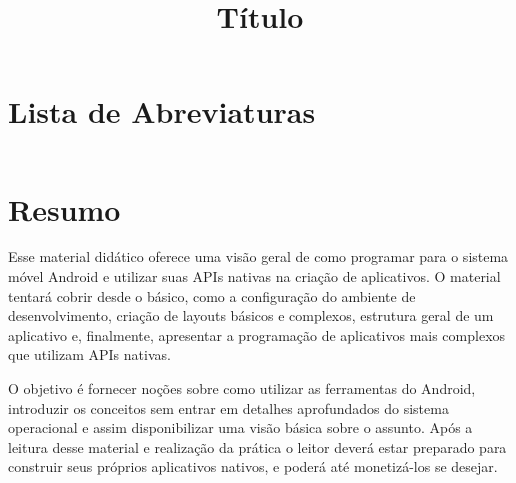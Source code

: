 \documentclass[a4paper,12pt,brazil]{book}
\title{Título}
\begin{document}



\pagestyle{empty}

\clearpage

\onehalfspace

\pagestyle{plain}

\setcounter{tocdepth}{1} %
\tableofcontents
\clearpage %
\thispagestyle{empty}

\listoffigures
{}
\clearpage %
\thispagestyle{empty}

\listoftables
{}
\clearpage %
\thispagestyle{empty}

\listoflistings
{}
\clearpage %
\thispagestyle{empty}

\chapter*{Lista de Abreviaturas}
\begin{longtable}{ll}
\end{longtable}



\chapter*{Resumo}

\begin{singlespace}
Esse material didático oferece uma visão geral de como programar para o sistema móvel Android e utilizar suas APIs nativas na criação de aplicativos. O material tentará cobrir desde o básico, como a configuração do ambiente de desenvolvimento, criação de layouts básicos e complexos, estrutura geral de um aplicativo e, finalmente, apresentar a programação de aplicativos mais complexos que utilizam APIs nativas.

O objetivo é fornecer noções sobre como utilizar as ferramentas do Android, introduzir os conceitos sem entrar em detalhes aprofundados do sistema operacional e assim disponibilizar uma visão básica sobre o assunto.
Após a leitura desse material e realização da prática o leitor deverá estar preparado para construir seus próprios aplicativos nativos, e poderá até monetizá-los se desejar.
\end{singlespace}
\end{document}
